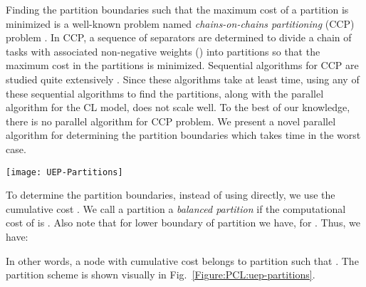\documentclass[conference,letterpaper,10pt]{IEEEtran}
\newcommand{\Figure}{Fig.\xspace}
\begin{document}
Finding the partition boundaries such that the maximum cost of a partition is minimized is a well-known problem named \textit{chains-on-chains partitioning} (CCP) problem \cite{Pinar2004}. In CCP, a sequence of  separators are determined to divide a chain of  tasks with associated non-negative weights () into  partitions so that the maximum cost in the partitions is minimized.
Sequential algorithms for CCP are studied quite extensively \cite{Manne1995,Olstad1995,Pinar2004}. Since these algorithms take at least  time, using any of these sequential algorithms to find the partitions, along with the parallel algorithm for the CL model, does not scale well. To the best of our knowledge, there is no parallel algorithm for CCP problem. We present a novel parallel algorithm for determining the partition boundaries which takes  time in the worst case.
\begin{figure*}[t]
\centering
\texttt{[image: UEP-Partitions]}
\caption{Uniform cost partitioning (UCP) scheme}
\label{Figure:PCL:uep-partitions}
\end{figure*}

To determine the partition boundaries, instead of using  directly, we use the cumulative cost . We call a partition  a \textit{balanced partition} if the computational cost of  is 
. 
Also note that for lower boundary  of partition  we have,  for . Thus, we have:

In other words, a node  with cumulative cost  belongs to partition  such that . The partition scheme is shown visually in \Figure~\ref{Figure:PCL:uep-partitions}.
\end{document}
